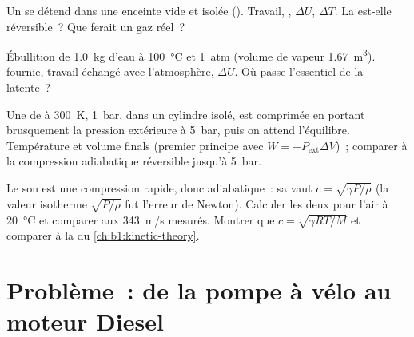 \begin{exercise}[$\star\star$]\label{exo:b1:first-law:9}
Un  se détend dans une enceinte vide et isolée (). Travail, , $\Delta U$, $\Delta T$. La
 est-elle réversible~? Que ferait un gaz réel~?
\end{exercise}

\begin{exercise}[$\star\star\star$]\label{exo:b1:first-law:10}
Ébullition de \qty{1.0}{kg} d'eau à \qty{100}{\degreeCelsius} et \qty{1}{atm}
(volume de vapeur \qty{1.67}{m^3}).  fournie, travail échangé avec
l'atmosphère, $\Delta U$. Où passe l'essentiel de la  latente~?
\end{exercise}

\begin{exercise}[$\star\star\star$]\label{exo:b1:first-law:11}
Une  de  à \qty{300}{K}, \qty{1}{bar}, dans un cylindre
isolé, est comprimée en portant brusquement la pression extérieure à
\qty{5}{bar}, puis on attend l'équilibre. Température et volume finals
(premier principe avec $W = -P_{\mathrm{ext}}\Delta V$)~; comparer à la
compression adiabatique réversible jusqu'à \qty{5}{bar}.
\end{exercise}

\begin{exercise}[$\star\star\star$]\label{exo:b1:first-law:12}
Le son est une compression rapide, donc adiabatique~: sa  vaut $c = \sqrt{\gamma P/\rho}$
(la valeur isotherme $\sqrt{P/\rho}$ fut l'erreur de Newton). Calculer les
deux pour l'air à \qty{20}{\degreeCelsius} et comparer aux \qty{343}{m/s}
mesurés. Montrer que $c = \sqrt{\gamma RT/M}$ et comparer à la  du \cref{ch:b1:kinetic-theory}.
\end{exercise}

\section{Problème~: de la pompe à vélo au moteur Diesel}

